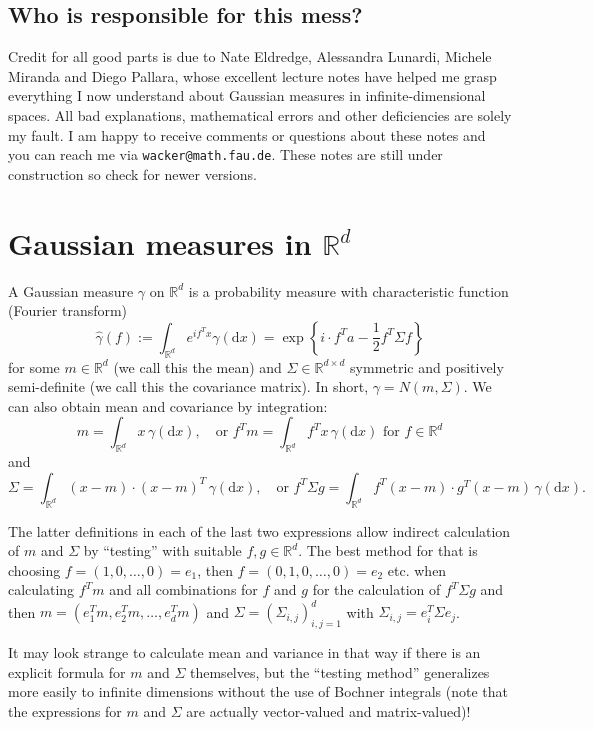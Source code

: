 \documentclass{scrartcl}
\theoremstyle{definition}
\theoremstyle{remark}
\newcommand{\de}{\mathrm d}
\newcommand{\R}{\mathbb R}
\begin{document}
\subsection{Who is responsible for this mess?}
Credit for all good parts is due to Nate Eldredge, Alessandra Lunardi, Michele Miranda and Diego Pallara, whose excellent lecture notes have helped me grasp everything I now understand about Gaussian measures in infinite-dimensional spaces. All bad explanations, mathematical errors and other deficiencies are solely my fault. I am happy to receive comments or questions about these notes and you can reach me via \texttt{wacker@math.fau.de}. These notes are still under construction so check for newer versions.
\section{Gaussian measures in $\R^d$}
A Gaussian measure $\gamma$ on $\R^d$ is a probability measure with characteristic function (Fourier transform)
\[ \hat \gamma(f) := \int_{\R^d} e^{if^Tx}\gamma(\de x) = \exp\left\{i\cdot f^Ta - \frac{1}{2}f^T\Sigma f\right\} \]
for some $m\in\R^d$ (we call this the mean) and $\Sigma \in\R^{d\times d}$ symmetric and positively semi-definite (we call this the covariance matrix). In short, $\gamma = N(m, \Sigma)$. 
We can also obtain mean and covariance by integration:
\[ m = \int_{\R^d} x \, \gamma(\de x),\quad \text{or } f^Tm = \int_{\R^d} f^T x \, \gamma(\de x) \text{ for } f\in\R^d \]
and 
\[ \Sigma = \int_{\R^d} (x-m)\cdot (x-m)^T \, \gamma(\de x), \quad \text{or } f^T\Sigma g = \int_{\R^d}f^T(x-m) \cdot g^T(x-m)\, \gamma(\de x). \]

The latter definitions in each of the last two expressions allow indirect calculation of $m$ and $\Sigma$ by ``testing'' with suitable $f,g\in \R^d$. The best method for that is choosing $f=(1,0,\ldots, 0)=e_1$, then $f = (0, 1, 0, \ldots, 0)=e_2$ etc. when calculating $f^Tm$ and all combinations for $f$ and $g$ for the calculation of $f^T\Sigma g$ and then $m = (e_1^Tm, e_2^Tm,\ldots, e_d^T m)$ and $\Sigma = (\Sigma_{i,j})_{i,j=1}^d$ with $\Sigma_{i,j} = e_i^T\Sigma e_j$. 

It may look strange to calculate mean and variance in that way if there is an explicit formula for $m$ and $\Sigma$ themselves, but the ``testing method'' generalizes more easily to infinite dimensions without the use of Bochner integrals (note that the expressions for $m$ and $\Sigma$ are actually vector-valued and matrix-valued)!
\end{document}
